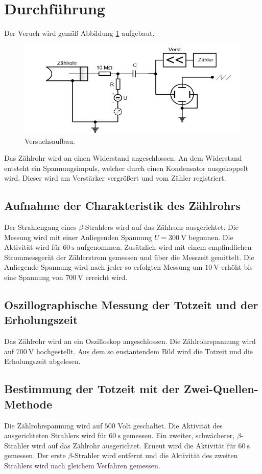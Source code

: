 \section{Durchführung}
\label{sec:Durchführung}
Der Veruch wird gemäß Abbildung \ref{fig:aufb} aufgebaut.
\begin{figure}[H]
  \centering
  \includegraphics[scale=0.4]{content/Aufbau.png}
  \caption{Versuchsaufbau.}
  \label{fig:aufb}
\end{figure}
\noindent Das Zählrohr wird an einen Widerstand angeschlossen.
An dem Widerstand entsteht ein Spannungsimpuls, welcher durch einen Kondensator ausgekoppelt wird.
Dieser wird am Verstärker vergrößert und vom Zähler registriert.

\subsection{Aufnahme der Charakteristik des Zählrohrs}
Der Strahlengang eines $\beta$-Strahlers wird auf das Zählrohr ausgerichtet.
Die Messung wird mit einer Anliegenden Spannung $U= \SI{300}{\volt}$ begonnen.
Die Aktivität wird für $\SI{60}{\second}$ aufgenommen.
Zusätzlich wird mit einem empfindlichen Strommessgerät der Zählerstrom gemessen und über die Messzeit gemittelt.
Die Anliegende Spannung wird nach jeder so erfolgten Messung um $\SI{10}{\volt}$ erhöht bis eine Spannung von $\SI{700}{\volt}$ erreicht wird.
\subsection{Oszillographische Messung der Totzeit und der Erholungszeit}
Das Zählrohr wird an ein Oszilloskop angeschlossen.
Die Zählrohrspannung wird auf $\SI{700}{\volt}$ hochgestellt.
Aus dem so enstantendem Bild wird die Totzeit und die Erholungszeit abgelesen.
\subsection{Bestimmung der Totzeit mit der Zwei-Quellen-Methode}
Die Zählrohrspannung wird auf $500$ Volt geschaltet.
Die Aktivität des ausgerichteten Strahlers wird für $\SI{60}{\second}$ gemessen.
Ein zweiter, schwächerer, $\beta$-Strahler wird auf  das Zählrohr ausgerichtet.
Erneut wird die Aktivität für $\SI{60}{\second}$ gemessen.
Der erste $\beta$-Strahler wird entfernt und die Aktivität des zweiten Strahlers wird nach gleichem Verfahren gemessen.
